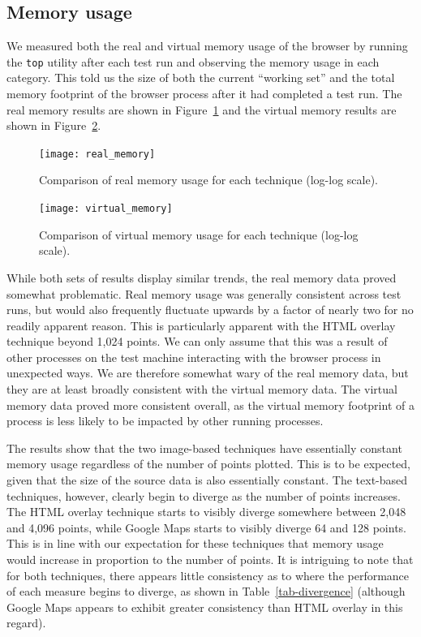 \documentclass[acmnow]{acmtrans2m}
\begin{document}
\subsection{Memory usage}

We measured both the real and virtual memory usage of the browser by
running the \texttt{top} utility after each test run and observing the
memory usage in each category. This told us the size of both the current
``working set'' and the total memory footprint of the browser process
after it had completed a test run. The real memory results are shown in
Figure~\ref{fig-real-memory} and the virtual memory results are shown in 
Figure~\ref{fig-virtual-memory}.


\begin{figure}
	\centering
	\texttt{[image: real\_memory]}
	\caption{Comparison of real memory usage for each technique (log-log scale).}
	\label{fig-real-memory}
\end{figure}


\begin{figure}
	\centering
	\texttt{[image: virtual\_memory]}
	\caption{Comparison of virtual memory usage for each technique (log-log scale).}
	\label{fig-virtual-memory}
\end{figure}


While both sets of results display similar trends, the real memory data
proved somewhat problematic. Real memory usage was generally consistent
across test runs, but would also frequently fluctuate upwards by a
factor of nearly two for no readily apparent reason. This is
particularly apparent with the HTML overlay technique beyond 1,024
points. We can only assume that this was a result of other processes on
the test machine interacting with the browser process in unexpected
ways. We are therefore somewhat wary of the real memory data, but they
are at least broadly consistent with the virtual memory data. The
virtual memory data proved more consistent overall, as the virtual
memory footprint of a process is less likely to be impacted by other
running processes.

The results show that the two image-based techniques have essentially
constant memory usage regardless of the number of points plotted. This
is to be expected, given that the size of the source data is also
essentially constant. The text-based techniques, however, clearly begin
to diverge as the number of points increases. The HTML overlay technique
starts to visibly diverge somewhere between 2,048 and 4,096 points,
while Google Maps starts to visibly diverge 64 and 128 points. This is
in line with our expectation for these techniques that memory usage
would increase in proportion to the number of points. It is intriguing
to note that for both techniques, there appears little consistency as to
where the performance of each measure begins to diverge, as shown in
Table~\ref{tab-divergence} (although Google Maps appears to exhibit
greater consistency than HTML overlay in this regard).
\end{document}

